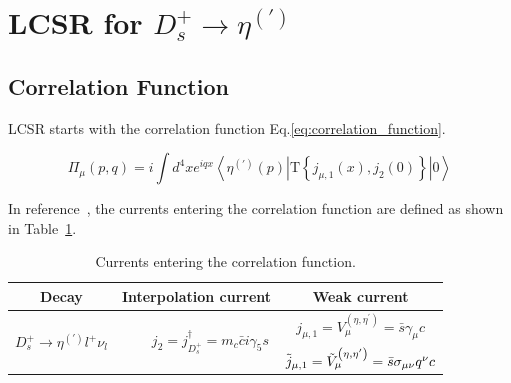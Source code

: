 \graphicspath{{Images/}}

\section{LCSR for $D_{s}^{+}\to\eta^{(\prime)}$}

\subsection{Correlation Function}

LCSR starts with the correlation function Eq.\ref{eq:correlation_function}.

\begin{equation}
    \Pi_\mu(p, q)=i \int d^4 x e^{i q x}\left\langle \eta^{(\prime)}(p)\left|\mathrm{T}\left\{j_{\mu,1}(x), j_{2}(0)\right\}\right| 0\right\rangle
    \label{eq:correlation_function}
\end{equation}

In reference~\cite{JHEP1}, the currents entering the correlation function are defined as shown in Table~\ref{tab:Currents}.

\begin{table}[htbp]
    \centering
    \caption{Currents entering the correlation function\cite{JHEP1}.}
    \vspace{4mm}
    \begin{tabular}{c | c c}
        \hline \hline
        \textbf{Decay}                                                                  & \textbf{Interpolation current}                                                                           & \textbf{Weak current} \\
        \hline
        \multirow{2}{*}{$D_{s}^{+}\rightarrow\eta^{(\prime)}l^{+}\nu_{l}$}              &
        \multirow{2}{5cm}{~~~~$j_{2} = j_{D_s^{+}}^{\dagger}=m_c \bar{c} i \gamma_5 s$} &
        $j_{\mu,1} = V_\mu^{\left(\eta, \eta^{\prime}\right)}=\bar{s} \gamma_\mu c$                                                                                                                                        \\
                                                                                        &
                                                                                        & $\Tilde{j}_{\mu,1} = \Tilde{V}_\mu^{\left(\eta, \eta^{\prime}\right)}=\bar{s} \sigma_{\mu\nu} q^{\nu} c$                         \\
        \hline\hline
    \end{tabular}
    \label{tab:Currents}
\end{table}

